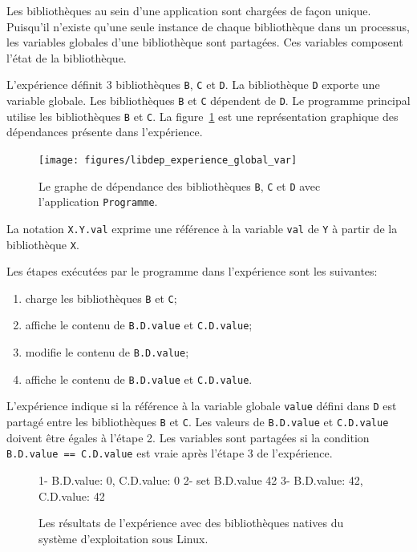 Les bibliothèques au sein d'une application sont chargées de façon unique.
Puisqu'il n'existe qu'une seule instance de chaque bibliothèque dans un
processus, les variables globales d'une bibliothèque sont partagées. Ces variables
composent l'état de la bibliothèque.

L'expérience définit 3 bibliothèques \texttt{B}, \texttt{C} et \texttt{D}. La bibliothèque
\texttt{D} exporte une variable globale. Les bibliothèques \texttt{B} et \texttt{C} dépendent
de \texttt{D}. Le programme principal utilise les bibliothèques \texttt{B} et \texttt{C}.
La figure~\ref{fig:libdep_experience_global_var} est une représentation graphique des dépendances
présente dans l'expérience.

\begin{figure}[ht]
  \centering
  \texttt{[image: figures/libdep\_experience\_global\_var]}
  \caption{Le graphe de dépendance des bibliothèques \texttt{B}, \texttt{C} et \texttt{D}
    avec l'application \texttt{Programme}.}
  \label{fig:libdep_experience_global_var}
\end{figure}

La notation \texttt{X.Y.val} exprime une référence à la variable \texttt{val}
de \texttt{Y} à partir de la bibliothèque \texttt{X}.

Les étapes exécutées par le programme dans l'expérience sont les suivantes:
\begin{enumerate}
  \item charge les bibliothèques \texttt{B} et \texttt{C};
  \item affiche le contenu de \texttt{B.D.value} et \texttt{C.D.value};
  \item modifie le contenu de \texttt{B.D.value};
  \item affiche le contenu de \texttt{B.D.value} et \texttt{C.D.value}.
\end{enumerate}
L'expérience indique si la référence à la variable globale \texttt{value} défini
dans \texttt{D} est partagé entre les bibliothèques \texttt{B} et \texttt{C}.
Les valeurs de \texttt{B.D.value} et \texttt{C.D.value} doivent être égales à l'étape 2.
Les variables sont partagées si la condition \verb+B.D.value == C.D.value+ est vraie après
l'étape 3 de l'expérience.\\
\begin{figure}[ht]
  \centering
  \lstset{frame=single}
  \begin{mplisting}{0.5}
1- B.D.value: 0,  C.D.value: 0
2- set B.D.value 42
3- B.D.value: 42,  C.D.value: 42
\end{mplisting}
  \caption{Les résultats de l'expérience avec des bibliothèques natives du système d'exploitation sous Linux.}
  \label{fig:result_global_var_experiment}
\end{figure}

